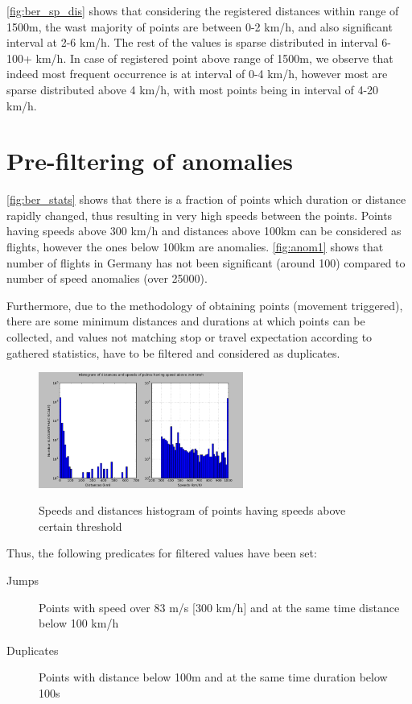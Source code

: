 \autoref{fig:ber_sp_dis} shows that considering the registered distances within range of 1500m, the wast majority of points are between 0-2 km/h, and also significant interval at 2-6 km/h. The rest of the values is sparse distributed in interval 6-100+ km/h. In case of registered point above range of 1500m, we observe that indeed most frequent occurrence is at interval of 0-4 km/h, however most are sparse distributed above 4 km/h, with most points being in interval of 4-20 km/h. 

\section{Pre-filtering of anomalies}
\label{cha:prefilter}
\autoref{fig:ber_stats} shows that there is a fraction of points which duration or distance rapidly changed, thus resulting in very high speeds between the points. Points having speeds above 300 km/h and distances above 100km can be considered as flights, however the ones below 100km are anomalies. \autoref{fig:anom1} shows that number of flights in Germany has not been significant (around 100) compared to number of speed anomalies (over 25000).

Furthermore, due to the methodology of obtaining points (movement triggered), there are some minimum distances and durations at which points can be collected, and values not matching stop or travel expectation according to gathered statistics, have to be filtered and considered as duplicates. 

\begin{figure}[!ht]
	\centering
	\includegraphics[width=0.6\textwidth]{images/anom1.png}\\
	\caption{ Speeds and distances histogram of points having speeds above certain threshold }
	\label{fig:anom1}
\end{figure}
\FloatBarrier

Thus, the following predicates for filtered values have been set:
\begin{description}
	\item[Jumps] Points with speed over 83 m/s [300 km/h] and at the same time distance below 100 km/h
	\item[Duplicates] Points with distance below 100m and at the same time duration below 100s
\end{description}

